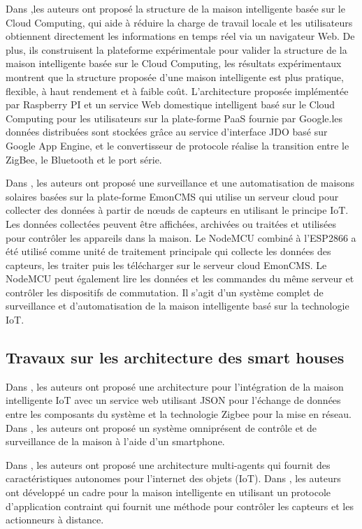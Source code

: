 Dans \cite{chap35},les auteurs ont proposé la structure de la maison intelligente basée sur le Cloud Computing, qui aide à réduire la charge de travail locale et les utilisateurs obtiennent directement les informations en temps réel via un navigateur Web. De plus, ils construisent la plateforme expérimentale pour valider la structure de la maison intelligente basée sur le Cloud Computing, les résultats expérimentaux montrent que la structure proposée d'une maison intelligente est plus pratique, flexible, à haut rendement et à faible coût. L'architecture proposée implémentée par Raspberry PI et un service Web domestique intelligent basé sur le Cloud Computing pour les utilisateurs sur la plate-forme PaaS fournie par Google.les données distribuées sont stockées grâce au service d'interface JDO basé sur Google App Engine, et le convertisseur de protocole réalise la transition entre le ZigBee, le Bluetooth et le port série.


Dans \cite{chap36} , les auteurs ont proposé une surveillance et une automatisation de maisons solaires basées sur la plate-forme EmonCMS qui utilise un serveur cloud pour collecter des données à partir de nœuds de capteurs en utilisant le principe IoT. Les données collectées peuvent être affichées, archivées ou traitées et utilisées pour contrôler les appareils dans la maison. Le NodeMCU combiné à l'ESP2866 a été utilisé comme unité de traitement principale qui collecte les données des capteurs, les traiter puis les télécharger sur le serveur cloud EmonCMS. Le NodeMCU peut également lire les données et les commandes du même serveur et contrôler les dispositifs de commutation. Il s'agit d'un système complet de surveillance et d'automatisation de la maison intelligente basé sur la technologie IoT.
\subsection{Travaux sur les architecture des smart houses}
Dans  \cite{chap34}, les auteurs ont proposé une architecture pour l'intégration de la maison intelligente IoT avec un service web utilisant JSON pour l'échange de données entre les composants du système et la technologie Zigbee pour la mise en réseau.  Dans \cite{chap39}, les auteurs ont proposé un système omniprésent de contrôle et de surveillance de la maison à l'aide d'un smartphone.


Dans \cite{chap310}, les auteurs ont proposé une architecture multi-agents qui fournit des caractéristiques autonomes pour l'internet des objets (IoT). Dans \cite{chap311},  les auteurs ont développé un cadre pour la maison intelligente en utilisant un protocole d'application contraint qui fournit une méthode pour contrôler les capteurs et les actionneurs à distance.


